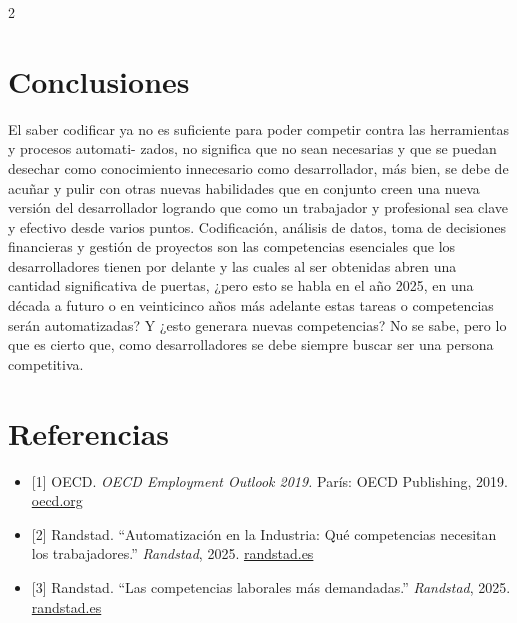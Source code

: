 \documentclass[12pt,spanish,Letterpaper,openany]{book}
\begin{document}
\begin {multicols}{2}
\hypertarget{conclusiones-10}{%
\section{Conclusiones}\label{conclusiones-10}}

El saber codificar ya no es suficiente para poder competir contra las herramientas y procesos
automati-
zados, no significa que no sean necesarias y que se puedan desechar como conocimiento
innecesario como desarrollador, más bien, se debe de acuñar y pulir con otras nuevas habilidades
que en conjunto creen una nueva versión del desarrollador logrando que como un trabajador y
profesional sea clave y efectivo desde varios puntos. Codificación, análisis de datos, toma de
decisiones financieras y gestión de proyectos son las competencias esenciales que los
desarrolladores tienen por delante y las cuales al ser obtenidas abren una cantidad significativa de
puertas, ¿pero esto se habla en el año 2025, en una década a futuro o en veinticinco años más
adelante estas tareas o competencias serán automatizadas? Y ¿esto generara nuevas competencias?
No se sabe, pero lo que es cierto que, como desarrolladores se debe siempre buscar ser una persona
competitiva.

\hypertarget{referencias-10}{%
\section{Referencias}\label{referencias-10}}

\begin{itemize}
\item
  {[}1{]} OECD. \emph{OECD Employment Outlook 2019.} París: OECD Publishing, 2019. \href{https://www.oecd.org/content/dam/oecd/es/publications/reports/2019/04/oecd-employment-outlook-2019_0d35ae00/bb5fff5a-es.pdf}{oecd.org}
\item
  {[}2{]} Randstad. ``Automatización en la Industria: Qué competencias necesitan los trabajadores.'' \emph{Randstad}, 2025. \href{https://www.randstad.es/contenidos360/desarrollo-profesional/automatizacion-industria-competencias-trabajadores/}{randstad.es}
\item
  {[}3{]} Randstad. ``Las competencias laborales más demandadas.'' \emph{Randstad}, 2025. \href{https://www.randstad.es/contenidos360/orientacion-laboral/competencias-laborales-mas-demandadas/}{randstad.es}
\end{itemize}

\end {multicols}
\end{document}
